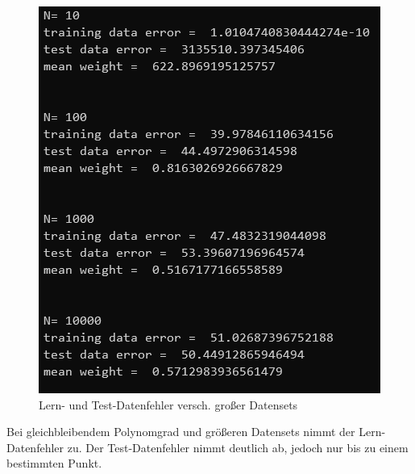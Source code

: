 \begin{figure}[H]
    \centering
    \includegraphics[width=1\linewidth]{sections/v2a1c4_result.png}
    \caption{Lern- und Test-Datenfehler versch. großer Datensets}
\end{figure}

Bei gleichbleibendem Polynomgrad und größeren Datensets nimmt der Lern-Datenfehler zu. Der Test-Datenfehler nimmt deutlich ab, jedoch nur bis zu einem bestimmten Punkt.
